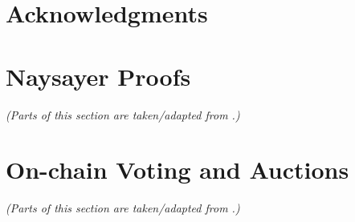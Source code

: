 \documentclass{article}
\renewcommand*{\backrefalt}[4]{}
\begin{document}
\newpage
\section*{Acknowledgments}

\newpage %


\renewcommand*{\backrefalt}[4]{\scriptsize%
    \ifcase #1%
          \or \textit{[p.~#2]}%
          \else \textit{[pp.~#2]}%
    \fi%
}

\newpage %
\tableofcontents

\newpage %




\section{Naysayer Proofs}\label{sec:naysayer}
\textit{(Parts of this section are taken/adapted from \cite{FC:SerGlaBon24}.)}

\bigskip








\section{On-chain Voting and Auctions}\label{sec:cicada}
\textit{(Parts of this section are taken/adapted from \cite{CTB:GSZB24}.)}












\end{document}
